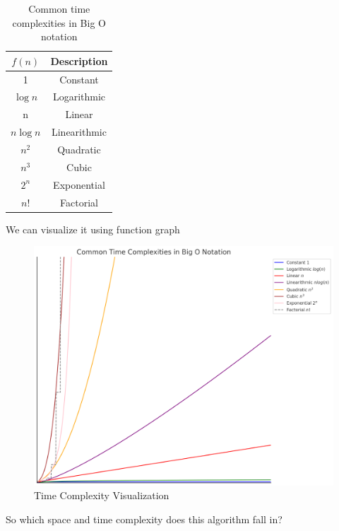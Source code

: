 \begin{table}[ht]
\centering
\begin{tabular}{@{}cc@{}}
\toprule
\( f(n) \) & Description \\ \midrule
1 & Constant \\
\( \log n \) & Logarithmic \\
n & Linear \\
\( n \log n \) & Linearithmic \\
\( n^2 \) & Quadratic \\
\( n^3 \) & Cubic \\
\( 2^n \) & Exponential \\ 
\(n!\) & Factorial \\
\bottomrule
\end{tabular}
\caption{Common time complexities in Big O notation}
\end{table}
We can visualize it using function graph
\begin{figure}[H]
    \centering
    \includegraphics[width=0.8\linewidth]{Images/time complexity.png}
    \caption{Time Complexity Visualization}
    
\end{figure}
So which space and time complexity does this algorithm fall in? 

